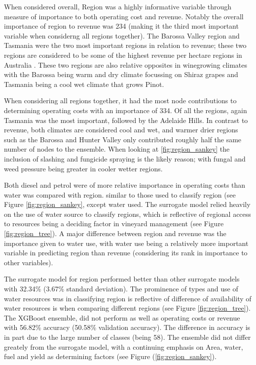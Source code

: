 \documentclass[review,12pt,authoryear]{elsarticle}
\begin{document}
\begin{linenumbers}
When considered overall, Region was a highly informative variable through measure of importance to both operating cost and revenue. Notably the overall importance of region to revenue was 234 (making it the third most important variable when considerng all regions together). The Barossa Valley region and Tasmania were the two most important regions in relation to revenue; these two regions are considered to be some of the highest revenue per hectare regions in Australia \citep{wineaustraliaNationalVintageReport2022}. These two regions are also relative opposites in winegrowing climates with the Barossa being warm and dry climate focussing on Shiraz grapes and Tasmania being a cool wet climate that grows Pinot. 
\par
When considering all regions together, it had the most node contributions to determining operating costs with an importance of 334. Of all the regions, again Tasmania was the most important, followed by the Adelaide Hills. In contrast to revenue, both climates are considered cool and wet, and warmer drier regions such as the Barossa and Hunter Valley only contributed roughly half the same number of nodes to the ensemble. When looking at \ref{fig:region_sankey} the inclusion of slashing and fungicide spraying is the likely reason; with fungal and weed pressure being greater in cooler wetter regions.
\par
Both diesel and petrol were of more relative importance in operating costs than water was compared with region. similar to those used to classify region (see Figure \ref{fig:region_sankey}, except water used. The surrogate model relied heavily on the use of water source to classify regions, which is reflective of regional access to resources being a deciding factor in vineyard management (see Figure \ref{fig:region_tree}). A major difference between region and revenue was the importance given to water use, with water use being a relatively more important variable in predicting region than revenue (considering its rank in importance to other variables). 
\par
The surrogate model for region performed better than other surrogate models with 32.34\% (3.67\% standard deviation). The prominence of types and use of water resources was in classifying region is reflective of difference of availability of water resources is when comparing different regions (see Figure \ref{fig:region_tree}). The XGBoost ensemble, did not perform as well as operating costs or revenue with 56.82\% accuracy (50.58\% validation accuracy). The difference in accuracy is in part due to the large number of classes (being 58). The ensemble did not differ greately from the surrogate model, with a continuing emphasis on Area, water, fuel and yield as determining factors (see Figure (\ref{fig:region_sankey}). 

\end{linenumbers}
\end{document}
